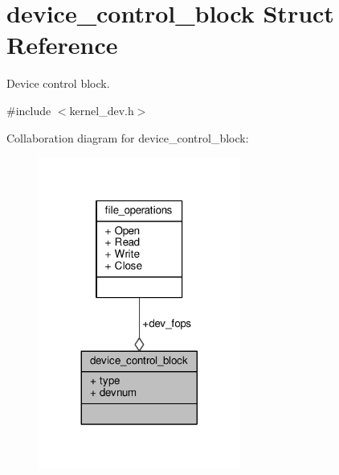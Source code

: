 \hypertarget{structdevice__control__block}{\section{device\-\_\-control\-\_\-block Struct Reference}
\label{structdevice__control__block}
}


Device control block.  




{\ttfamily \#include $<$kernel\-\_\-dev.\-h$>$}



Collaboration diagram for device\-\_\-control\-\_\-block\-:
\nopagebreak
\begin{figure}[H]
\begin{center}
\leavevmode
\includegraphics[width=188pt]{structdevice__control__block__coll__graph}
\end{center}
\end{figure}
